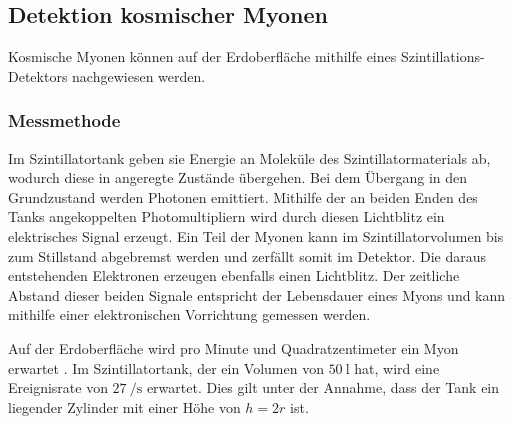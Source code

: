 \subsection{Detektion kosmischer Myonen}
Kosmische Myonen können auf der Erdoberfläche mithilfe eines Szintillations-Detektors nachgewiesen werden. 

\subsubsection{Messmethode}
Im Szintillatortank geben sie Energie an Moleküle des Szintillatormaterials ab, wodurch diese in angeregte Zustände übergehen. Bei dem Übergang in den Grundzustand werden Photonen emittiert. Mithilfe der an beiden Enden des Tanks angekoppelten Photomultipliern wird durch diesen Lichtblitz  ein elektrisches Signal erzeugt. Ein Teil der Myonen kann im Szintillatorvolumen bis zum Stillstand abgebremst werden und zerfällt somit im Detektor. Die daraus entstehenden Elektronen erzeugen ebenfalls einen Lichtblitz. Der zeitliche Abstand dieser beiden Signale entspricht der Lebensdauer eines Myons und kann mithilfe einer elektronischen Vorrichtung gemessen werden.

Auf der Erdoberfläche wird pro Minute und Quadratzentimeter ein Myon erwartet \cite{Grupen}.  Im Szintillatortank, der ein Volumen von $\SI{50}{\litre}$ hat, wird eine Ereignisrate von $\SI{27}{\per\second}$ erwartet. Dies gilt unter der Annahme, dass der Tank ein liegender Zylinder mit einer Höhe von $h = 2r$ ist.


